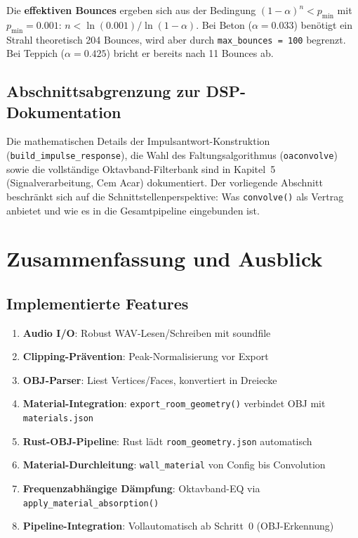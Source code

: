 \documentclass[11pt,a4paper,twoside]{report}
\begin{document}
Die \textbf{effektiven Bounces} ergeben sich aus der Bedingung
$(1 - \alpha)^n < p_{\min}$ mit $p_{\min} = 0.001$:
$n < \ln(0.001) / \ln(1 - \alpha)$.
Bei Beton ($\alpha = 0.033$) ben\"otigt ein Strahl theoretisch 204 Bounces,
wird aber durch \texttt{max\_bounces = 100} begrenzt.
Bei Teppich ($\alpha = 0.425$) bricht er bereits nach 11 Bounces ab.

\section{Abschnittsabgrenzung zur DSP-Dokumentation}

Die mathematischen Details der Impulsantwort-Konstruktion (\texttt{build\_impulse\_response}),
die Wahl des Faltungsalgorithmus (\texttt{oaconvolve}) sowie die vollst\"andige
Oktavband-Filterbank sind in Kapitel~5 (Signalverarbeitung, Cem Acar) dokumentiert.
Der vorliegende Abschnitt beschr\"ankt sich auf die Schnittstellenperspektive:
Was \texttt{convolve()} als Vertrag anbietet und wie es in die Gesamtpipeline
eingebunden ist.

\chapter{Zusammenfassung und Ausblick}

\section{Implementierte Features}

\begin{enumerate}
    \item \textbf{Audio I/O}: Robust WAV-Lesen/Schreiben mit soundfile
    \item \textbf{Clipping-Pr\"avention}: Peak-Normalisierung vor Export
    \item \textbf{OBJ-Parser}: Liest Vertices/Faces, konvertiert in Dreiecke
    \item \textbf{Material-Integration}: \texttt{export\_room\_geometry()} verbindet OBJ mit \texttt{materials.json}
    \item \textbf{Rust-OBJ-Pipeline}: Rust l\"adt \texttt{room\_geometry.json} automatisch
    \item \textbf{Material-Durchleitung}: \texttt{wall\_material} von Config bis Convolution
    \item \textbf{Frequenzabh\"angige D\"ampfung}: Oktavband-EQ via \texttt{apply\_material\_absorption()}
    \item \textbf{Pipeline-Integration}: Vollautomatisch ab Schritt~0 (OBJ-Erkennung)
\end{enumerate}
\end{document}
